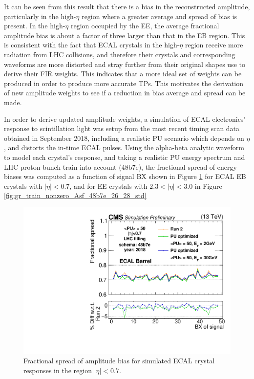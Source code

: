 It can be seen from this result that there is a bias in the reconstructed amplitude, particularly in the high-$\eta$ region where a greater average and spread of bias is present. In the high-$\eta$ region occupied by the EE, the average fractional amplitude bias is about a factor of three larger than that in the EB region. This is consistent with the fact that ECAL crystals in the high-$\eta$ region receive more radiation from LHC collisions, and therefore their crystals and corresponding waveforms are more distorted and stray further from their original shapes use to derive their FIR weights. This indicates that a more ideal set of weights can be produced in order to produce more accurate TPs. This motivates the derivation of new amplitude weights to see if a reduction in bias average and spread can be made. 

In order to derive updated amplitude weights, a simulation of ECAL electronics' response to scintillation light was setup from the most recent timing scan data obtained in September 2018, including a realistic PU scenario which depends on $\eta$, and distorts the in-time ECAL pulses. Using the alpha-beta analytic waveform to model each crystal's response, and taking a realistic PU energy spectrum and LHC proton bunch train into account (48b7e), the fractional spread of energy biases was computed as a function of signal BX shown in Figure \ref{fig:gr_train_nonzero_Asf_48b7e_0_8_std} for ECAL EB crystals with $|\eta| < 0.7$, and for EE crystals with $2.3 < |\eta| < 3.0$ in Figure \ref{fig:gr_train_nonzero_Asf_48b7e_26_28_std} \cite{CMS-DP-2022-016, CMS-DP-2022-016_Plots}

\begin{figure}[H]
    \centering
    \includegraphics[width=\textwidth]{Images/ECAL/TPG/gr_train_nonzero_Asf_48b7e_0_8_std.pdf}
    \caption{Fractional spread of amplitude bias for simulated ECAL crystal responses in the region $|\eta| < 0.7$.}
    \label{fig:gr_train_nonzero_Asf_48b7e_0_8_std}
\end{figure}

